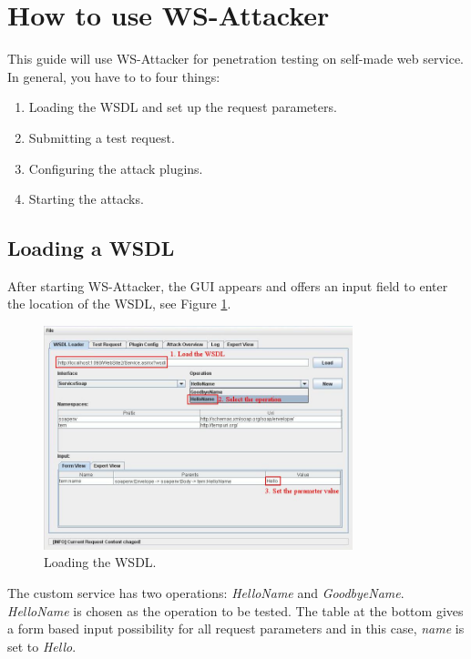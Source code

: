 \section{How to use WS-Attacker}
\label{sec:how_to_use_ws_attacker}

This guide will use WS-Attacker for penetration testing on self-made web service.
In general, you have to to four things:

\begin{enumerate}
    \item Loading the WSDL and set up the request parameters.
    \item Submitting a test request.
    \item Configuring the attack plugins.
    \item Starting the attacks.
\end{enumerate}

\subsection{Loading a WSDL}
\label{sec:loading_a_wsdl}

After starting WS-Attacker, the GUI appears and offers an input field to enter the location
of the WSDL, see Figure \ref{fig:load_wsdl}.

\begin{figure}[h!]
    \begin{center}
        \includegraphics[width=0.8\textwidth]{img/load_wsdl}
    \end{center}
    \caption{Loading the WSDL.}
    \label{fig:load_wsdl}
\end{figure}

The custom service has two operations: \emph{HelloName} and \emph{GoodbyeName}.
\emph{HelloName} is chosen as the operation to be tested. The table at the bottom gives a
form based input possibility for all request parameters and in this case, \emph{name} is set to
\emph{Hello}.

